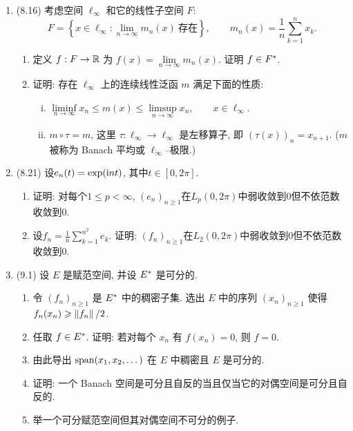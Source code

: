 \begin{enumerate}[label=\textbf{\arabic*.}, ref=\arabic*]
	\item (8.16) 考虑空间 $ \ell_{\infty} $ 和它的线性子空间 $ F $:
	      \[
		      F = \left\{ x\in\ell_{\infty}:\lim_{n\to\infty} m_{n}(x)\ \text{存在} \right\}, \qquad m_{n}(x)=\frac{1}{n}\sum_{k=1}^{n} x_{k}.
	      \]
	      \begin{enumerate}[(1)]
		      \item 定义 $ f:F\to\mathbb{R} $ 为 $ f(x)=\lim\limits_{n\to\infty}m_{n}(x) $. 证明 $ f\in F^{*} $.
		      \item 证明: 存在 $ \ell_{\infty} $ 上的连续线性泛函 $ m $ 满足下面的性质:
		            \begin{enumerate}[(i)]
			            \item $ \liminf\limits_{n\to\infty}x_{n}\leqslant m(x)\leqslant\limsup\limits_{n\to\infty}x_{n}, \qquad x\in\ell_{\infty} $.
			            \item $ m\circ \tau=m $, 这里 $ \tau: \ell_{\infty}\to\ell_{\infty} $ 是左移算子, 即 $ (\tau(x))_{n}=x_{n+1} $. ($ m $ 被称为 Banach 平均或 $ \ell_{\infty} $--极限.)
		            \end{enumerate}
	      \end{enumerate}
	\item (8.21) 设$ e_n(t)=\exp(\mathrm{i} nt) $, 其中$ t\in[0,2\pi] $.
	      \begin{enumerate}[(1)]
		      \item 证明: 对每个$ 1\leqslant p<\infty $, $ (e_n)_{n\geqslant 1} $在$ L_p(0,2\pi) $中弱收敛到0但不依范数收敛到0.
		      \item 设$ f_n=\frac{1}{n}\sum\limits_{k=1}^{n^2}e_k $. 证明: $ (f_n)_{n\geqslant 1} $在$ L_2(0,2\pi) $中弱收敛到0但不依范数收敛到0.
	      \end{enumerate}
	\item (9.1) 设 $ E $ 是赋范空间, 并设 $ E^{*} $ 是可分的.
	      \begin{enumerate}[(1)]
		      \item 令 $ (f_{n})_{n\geqslant1} $ 是 $ E^{*} $ 中的稠密子集. 选出 $ E $ 中的序列 $ (x_{n})_{n\geqslant1} $ 使得 $ f_{n}(x_{n})\geqslant \left\| f_{n} \right\|/2 $.
		      \item 任取 $ f\in E^{*} $. 证明: 若对每个 $ x_{n} $ 有 $ f(x_{n})=0 $, 则 $ f=0 $.
		      \item 由此导出 $ \operatorname{span}(x_{1}, x_{2}, \dots) $ 在 $ E $ 中稠密且 $ E $ 是可分的.
		      \item 证明: 一个 Banach 空间是可分且自反的当且仅当它的对偶空间是可分且自反的.
		      \item 举一个可分赋范空间但其对偶空间不可分的例子.

\end{enumerate}
\end{enumerate}
